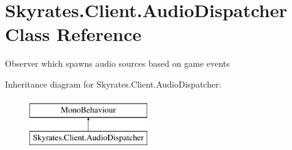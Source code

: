 \hypertarget{class_skyrates_1_1_client_1_1_audio_dispatcher}{\section{Skyrates.\-Client.\-Audio\-Dispatcher Class Reference}
\label{class_skyrates_1_1_client_1_1_audio_dispatcher}
}


Observer which spawns audio sources based on game events  


Inheritance diagram for Skyrates.\-Client.\-Audio\-Dispatcher\-:\begin{figure}[H]
\begin{center}
\leavevmode
\includegraphics[height=2.000000cm]{class_skyrates_1_1_client_1_1_audio_dispatcher}
\end{center}
\end{figure}
